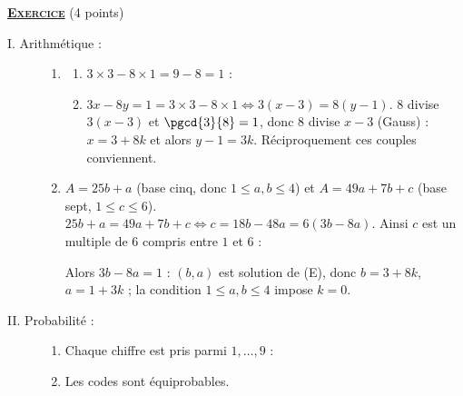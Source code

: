 \providecommand{\cm}{~\mathrm{cm}}
\providecommand{\dx}{~\mathrm{d}x}
\providecommand{\Courbe}{(\mathscr{C})}
\providecommand{\bary}[1]{\mathrm{bar}\left\lbrace #1 \right\rbrace}
\providecommand{\Angl}[2]{\left( \overrightarrow{#1} ; \overrightarrow{#2} \right)}
%
\noindent \underline{\textsc{\textbf{Exercice}}} (4 points)
\begin{description}
	\item[I. Arithmétique :]
	\begin{enumerate}
		\item
		\begin{enumerate}
			\item {}
				$3 \times 3 - 8 \times 1 = 9 - 8 = 1$ : \par\noindent{}
			\item {}
				$3x - 8y = 1 = 3 \times 3 - 8 \times 1 \iff 3(x - 3) = 8(y - 1)$.
				$8$ divise $3(x-3)$ et $\pgcd{3}{8} = 1$, donc $8$ divise $x - 3$ (Gauss) : $x = 3 + 8k$ et alors $y - 1 = 3k$. Réciproquement ces couples conviennent.
				\par\noindent{}
		\end{enumerate}
		\item {}
			$A = 25b + a$ (base cinq, donc $1 \leq a, b \leq 4$) et $A = 49a + 7b + c$ (base sept, $1 \leq c \leq 6$).
			$25b + a = 49a + 7b + c \iff c = 18b - 48a = 6(3b - 8a)$.
			Ainsi $c$ est un multiple de $6$ compris entre $1$ et $6$ : \par\noindent{}
			Alors $3b - 8a = 1$ : $(b,a)$ est solution de (E), donc $b = 3 + 8k$, $a = 1 + 3k$ ; la condition $1 \leq a, b \leq 4$ impose $k = 0$.
			\par\noindent{}
	\end{enumerate}
	\item[II. Probabilité :]
	\begin{enumerate}
		\item {}
			Chaque chiffre est pris parmi $1, \ldots, 9$ : \par\noindent{}
		\item Les codes sont équiprobables.

\end{enumerate}
\end{description}
